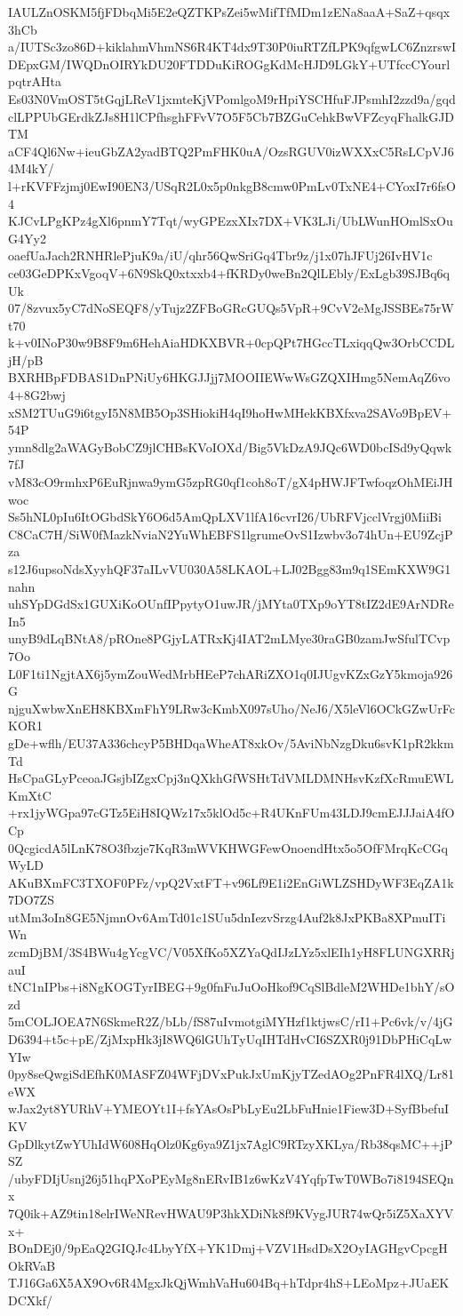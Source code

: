 IAULZnOSKM5fjFDbqMi5E2eQZTKPsZei5wMifTfMDm1zENa8aaA+SaZ+qsqx3hCb
a/IUTSc3zo86D+kiklahmVhmNS6R4KT4dx9T30P0iuRTZfLPK9qfgwLC6ZnzrswI
DEpxGM/IWQDnOIRYkDU20FTDDuKiROGgKdMcHJD9LGkY+UTfccCYourlpqtrAHta
Es03N0VmOST5tGqjLReV1jxmteKjVPomlgoM9rHpiYSCHfuFJPsmhI2zzd9a/gqd
clLPPUbGErdkZJs8H1lCPfhsghFFvV7O5F5Cb7BZGuCehkBwVFZcyqFhalkGJDTM
aCF4Ql6Nw+ieuGbZA2yadBTQ2PmFHK0uA/OzsRGUV0izWXXxC5RsLCpVJ64M4kY/
l+rKVFFzjmj0EwI90EN3/USqR2L0x5p0nkgB8cmw0PmLv0TxNE4+CYoxI7r6fsO4
KJCvLPgKPz4gXl6pnmY7Tqt/wyGPEzxXIx7DX+VK3LJi/UbLWunHOmlSxOuG4Yy2
oaefUaJach2RNHRlePjuK9a/iU/qhr56QwSriGq4Tbr9z/j1x07hJFUj26IvHV1c
ce03GeDPKxVgoqV+6N9SkQ0xtxxb4+fKRDy0weBn2QlLEbly/ExLgb39SJBq6qUk
07/8zvux5yC7dNoSEQF8/yTujz2ZFBoGRcGUQs5VpR+9CvV2eMgJSSBEs75rWt70
k+v0INoP30w9B8F9m6HehAiaHDKXBVR+0cpQPt7HGccTLxiqqQw3OrbCCDLjH/pB
BXRHBpFDBAS1DnPNiUy6HKGJJjj7MOOIIEWwWsGZQXIHmg5NemAqZ6vo4+8G2bwj
xSM2TUuG9i6tgyI5N8MB5Op3SHiokiH4qI9hoHwMHekKBXfxva2SAVo9BpEV+54P
ymn8dlg2aWAGyBobCZ9jlCHBsKVoIOXd/Big5VkDzA9JQc6WD0bcISd9yQqwk7fJ
vM83cO9rmhxP6EuRjnwa9ymG5zpRG0qf1coh8oT/gX4pHWJFTwfoqzOhMEiJHwoc
Ss5hNL0pIu6ItOGbdSkY6O6d5AmQpLXV1lfA16cvrI26/UbRFVjcclVrgj0MiiBi
C8CaC7H/SiW0fMazkNviaN2YuWhEBFS1lgrumeOvS1Izwbv3o74hUn+EU9ZcjPza
s12J6upsoNdsXyyhQF37aILvVU030A58LKAOL+LJ02Bgg83m9q1SEmKXW9G1nahn
uhSYpDGdSx1GUXiKoOUnfIPpytyO1uwJR/jMYta0TXp9oYT8tIZ2dE9ArNDReIn5
unyB9dLqBNtA8/pROne8PGjyLATRxKj4IAT2mLMye30raGB0zamJwSfulTCvp7Oo
L0F1ti1NgjtAX6j5ymZouWedMrbHEeP7chARiZXO1q0IJUgvKZxGzY5kmoja926G
njguXwbwXnEH8KBXmFhY9LRw3cKmbX097sUho/NeJ6/X5leVl6OCkGZwUrFcKOR1
gDe+wflh/EU37A336chcyP5BHDqaWheAT8xkOv/5AviNbNzgDku6svK1pR2kkmTd
HsCpaGLyPceoaJGsjbIZgxCpj3nQXkhGfWSHtTdVMLDMNHsvKzfXcRmuEWLKmXtC
+rx1jyWGpa97cGTz5EiH8IQWz17x5klOd5c+R4UKnFUm43LDJ9cmEJJJaiA4fOCp
0QcgicdA5lLnK78O3fbzje7KqR3mWVKHWGFewOnoendHtx5o5OfFMrqKcCGqWyLD
AKuBXmFC3TXOF0PFz/vpQ2VxtFT+v96Lf9E1i2EnGiWLZSHDyWF3EqZA1k7DO7ZS
utMm3oIn8GE5NjmnOv6AmTd01c1SUu5dnIezvSrzg4Auf2k8JxPKBa8XPmuITiWn
zcmDjBM/3S4BWu4gYcgVC/V05XfKo5XZYaQdIJzLYz5xlEIh1yH8FLUNGXRRjauI
tNC1nIPbs+i8NgKOGTyrIBEG+9g0fnFuJuOoHkof9CqSlBdleM2WHDe1bhY/sOzd
5mCOLJOEA7N6SkmeR2Z/bLb/fS87uIvmotgiMYHzf1ktjwsC/rI1+Pc6vk/v/4jG
D6394+t5c+pE/ZjMxpHk3jI8WQ6lGUhTyUqIHTdHvCI6SZXR0j91DbPHiCqLwYIw
0py8seQwgiSdEfhK0MASFZ04WFjDVxPukJxUmKjyTZedAOg2PnFR4lXQ/Lr81eWX
wJax2yt8YURhV+YMEOYt1I+fsYAsOsPbLyEu2LbFuHnie1Fiew3D+SyfBbefuIKV
GpDlkytZwYUhIdW608HqOlz0Kg6ya9Z1jx7AglC9RTzyXKLya/Rb38qsMC++jPSZ
/ubyFDIjUsnj26j51hqPXoPEyMg8nERvIB1z6wKzV4YqfpTwT0WBo7i8194SEQnx
7Q0ik+AZ9tin18elrIWeNRevHWAU9P3hkXDiNk8f9KVygJUR74wQr5iZ5XaXYVx+
BOnDEj0/9pEaQ2GIQJc4LbyYfX+YK1Dmj+VZV1HsdDsX2OyIAGHgvCpcgHOkRVaB
TJ16Ga6X5AX9Ov6R4MgxJkQjWmhVaHu604Bq+hTdpr4hS+LEoMpz+JUaEKDCXkf/
